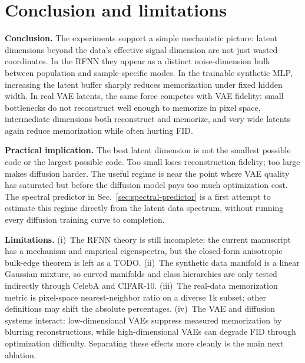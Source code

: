 \section{Conclusion and limitations}
\label{sec:discussion}

\textbf{Conclusion.}
The experiments support a simple mechanistic picture: latent
dimensions beyond the data's effective signal dimension are not
just wasted coordinates. In the RFNN they appear as a distinct
noise-dimension bulk between population and sample-specific modes.
In the trainable synthetic MLP, increasing the latent buffer sharply
reduces memorization under fixed hidden width. In real VAE latents,
the same force competes with VAE fidelity: small bottlenecks do not
reconstruct well enough to memorize in pixel space, intermediate
dimensions both reconstruct and memorize, and very wide latents
again reduce memorization while often hurting FID.

\textbf{Practical implication.}
The best latent dimension is not the smallest possible code or the
largest possible code. Too small loses reconstruction fidelity; too
large makes diffusion harder. The useful regime is near the point
where VAE quality has saturated but before the diffusion model pays
too much optimization cost. The spectral predictor in
Sec.~\ref{sec:spectral-predictor} is a first attempt to estimate
this regime directly from the latent data spectrum, without running
every diffusion training curve to completion.

\textbf{Limitations.}
(i)~The RFNN theory is still incomplete: the current manuscript has
a mechanism and empirical eigenspectra, but the closed-form
anisotropic bulk-edge theorem is left as a TODO. (ii)~The synthetic
data manifold is a linear Gaussian mixture, so curved manifolds and
class hierarchies are only tested indirectly through CelebA and
CIFAR-10. (iii)~The real-data memorization metric is pixel-space
nearest-neighbor ratio on a diverse 1k subset; other definitions
may shift the absolute percentages. (iv)~The VAE and diffusion
systems interact: low-dimensional VAEs suppress measured
memorization by blurring reconstructions, while high-dimensional
VAEs can degrade FID through optimization difficulty. Separating
these effects more cleanly is the main next ablation.
